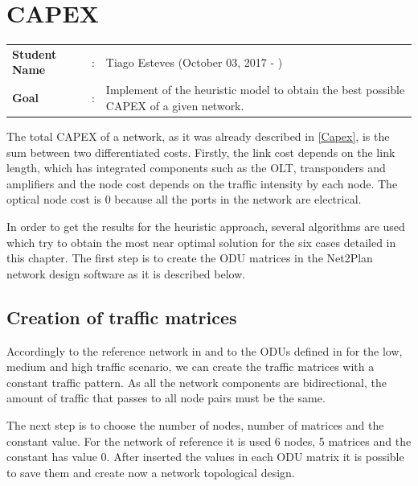 \clearpage

\section{CAPEX}
\begin{tcolorbox}	
\begin{tabular}{p{2.75cm} p{0.2cm} p{10.5cm}} 	
\textbf{Student Name}  &:& Tiago Esteves    (October 03, 2017 - )\\
\textbf{Goal}          &:& Implement of the heuristic model to obtain the best possible CAPEX of a given network.
\end{tabular}
\end{tcolorbox}
\vspace{11pt}

The total CAPEX of a network, as it was already described in \ref{Capex}, is the sum between two differentiated costs. Firstly, the link cost depends on the link length, which has integrated components such as the OLT, transponders and amplifiers and the node cost depends on the traffic intensity by each node. The optical node cost is 0 because all the ports in the network are electrical.

In order to get the results for the heuristic approach, several algorithms are used which try to obtain the most near optimal solution for the six cases detailed in this chapter. The first step is to create the ODU matrices in the Net2Plan network design software as it is described below.

\subsection{Creation of traffic matrices}\label{creation_traffic_matrices}

Accordingly to the reference network in \label{Reference_Network_Traffic} and to the ODUs defined in \label{low_traffic_scenario} for the low, medium and high traffic scenario, we can create the traffic matrices with a constant traffic pattern. As all the network components are bidirectional, the amount of traffic that passes to all node pairs must be the same.

The next step is to choose the number of nodes, number of matrices and the constant value. For the network of reference it is used 6 nodes, 5 matrices and the constant has value 0. After inserted the values in each ODU matrix it is possible to save them and create now a network topological design.

